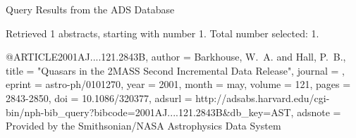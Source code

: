 Query Results from the ADS Database


Retrieved 1 abstracts, starting with number 1.  Total number selected: 1.

@ARTICLE{2001AJ....121.2843B,
   author = {{Barkhouse}, W.~A. and {Hall}, P.~B.},
    title = "{Quasars in the 2MASS Second Incremental Data Release}",
  journal = {\aj},
   eprint = {astro-ph/0101270},
     year = 2001,
    month = may,
   volume = 121,
    pages = {2843-2850},
      doi = {10.1086/320377},
   adsurl = {http://adsabs.harvard.edu/cgi-bin/nph-bib_query?bibcode=2001AJ....121.2843B&db_key=AST},
  adsnote = {Provided by the Smithsonian/NASA Astrophysics Data System}
}


